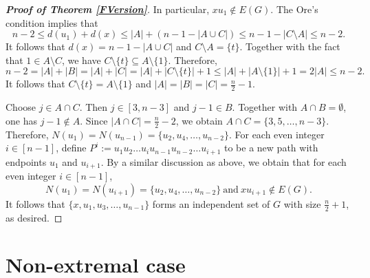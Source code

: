 \documentclass[11pt, a4paper]{article}
\newtheorem{theorem}{Theorem}[section]
\theoremstyle{definition}
\newcommand{\eps}{\varepsilon}
\newcommand{\<}{\subseteq}
\begin{document}
\begin{proof}[\bf Proof of Theorem \ref{FVersion}]
In particular, $xu_1\notin E(G)$. The Ore's condition implies that 
$$
n-2\leq d(u_1)+d(x)\leq |A|+(n-1-|A\cup C|)\leq 
n-1-|C\setminus A|\leq n-2. %
$$
It follows that $d(x)=n-1-|A\cup C|$ and $C\setminus A=\{t\}$. %
Together with the fact that $1\in A\setminus C$, we have $C\setminus \{t\}\subseteq A\setminus \{1\}$. Therefore, 
$$
n-2=|A|+|B|=|A|+|C|=|A|+|C\setminus \{t\}|+1\leq |A|+|A\setminus \{1\}|+1 =2|A|\leq n-2.
$$
It follows that $C\setminus \{t\}=A\setminus \{1\}$ and   $|A|=|B|=|C|=\frac{n}{2}-1$. 

 

Choose $j\in A\cap C$. Then $j\in [3,n-3]$ and $j-1\in B$.  Together with $A\cap B=\emptyset$, one has ${j-1}\notin A$. Since $|A\cap C|=\frac{n}{2}-2$, we obtain $A\cap  C=\{3,5,\ldots,n-3\}$. Therefore, $N(u_1)=N(u_{n-1})=\{u_2,u_4,\ldots,u_{n-2}\}$. For each even integer $i\in [n-1]$, define  $P^i:=u_1u_2\ldots u_{i}u_{n-1}u_{n-2}\ldots u_{i+1}$  to be a new path with endpoints $u_1$ and $u_{i+1}$. By a similar discussion as above, we obtain that for each even integer $i\in [n-1]$,
$$
N(u_1)=N(u_{i+1})=\{u_2,u_4,\ldots,u_{n-2}\}\ \text{and}\ xu_{i+1}\notin E(G).
$$
It follows that $\{x,u_1,u_3,\ldots,u_{n-1}\}$ forms an independent set of $G$ with size $\frac{n}{2}+1$, as desired.   
\end{proof}

\section{Non-extremal case}\label{section4}


\end{document}
